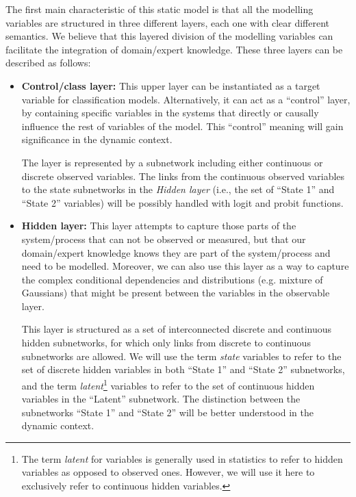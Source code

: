 The first main characteristic of this static model is that all the modelling variables are structured in three different layers, each one with clear different semantics. We believe that this layered division of the modelling variables can facilitate the integration of domain/expert knowledge. These three layers can be described as follows:


\begin{itemize}

\item \textbf{Control/class layer:}  This upper layer can be instantiated as a target variable for classification models. Alternatively, it can  act as a ``control'' layer, by containing specific variables in the systems that directly or causally influence the rest of variables of the model. This ``control'' meaning will gain significance in the dynamic context.

The layer is represented by a subnetwork including either continuous or discrete observed variables. The links from the continuous observed variables to the state subnetworks in the \textit{Hidden layer} (i.e., the set of ``State 1'' and ``State 2'' variables) will be possibly handled with logit and probit functions.

\item \textbf{Hidden layer:}  This layer attempts to capture those parts of the system/process that can not be observed or measured, but that our domain/expert knowledge knows they are part of the system/process and need to be modelled. Moreover, we can also use this layer as a way to capture the complex conditional dependencies and distributions (e.g. mixture of Gaussians) that might be present between the variables in the observable layer. 

This layer is structured as a set of interconnected discrete and continuous hidden subnetworks, for which only links from discrete to continuous subnetworks are allowed. We will use the term \textit{state} variables to refer to the set of discrete hidden variables in both ``State 1'' and ``State 2'' subnetworks, and the term \textit{latent}\footnote{The term \textit{latent} for variables is generally used in statistics to refer to hidden variables as opposed to observed ones. However, we will use it here to exclusively refer to continuous hidden variables.} variables to refer to the set of continuous hidden variables in the ``Latent'' subnetwork. The distinction between the subnetworks ``State 1'' and ``State 2'' will be better understood in the dynamic context. 


\end{itemize}
